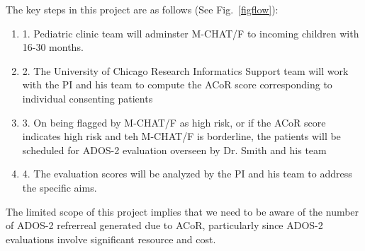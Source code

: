 \documentclass[onecolumn, compsoc,11pt]{IEEEtran}
\def\ZERO{ACoR\xspace}
\begin{document}

The key steps in this project are as  follows (See Fig.~\ref{figflow}):

\begin{enumerate} 
[label=$\square$, leftmargin=0pt,
labelindent=0em, topsep=0.1em, labelsep=*, itemsep=.5em,itemindent=1em]
 \item 1. Pediatric clinic team  will  adminster  M-CHAT/F to incoming children with 16-30 months.
\item 2. The University of Chicago Research Informatics Support team will work with the PI and his team to
  compute the \ZERO score corresponding to individual consenting patients
\item 3. On being flagged by M-CHAT/F  as high risk, or if the \ZERO score indicates high risk and teh M-CHAT/F is borderline,  the patients will be scheduled for ADOS-2 evaluation overseen by Dr. Smith and his team
\item 4. The evaluation scores will be analyzed by the PI and his  team to address the specific aims.
\end{enumerate}
The limited scope of this project implies that we need to be aware of the number of ADOS-2 refrerreal generated due to \ZERO, particularly since ADOS-2 evaluations involve significant resource and cost.
\end{document}
